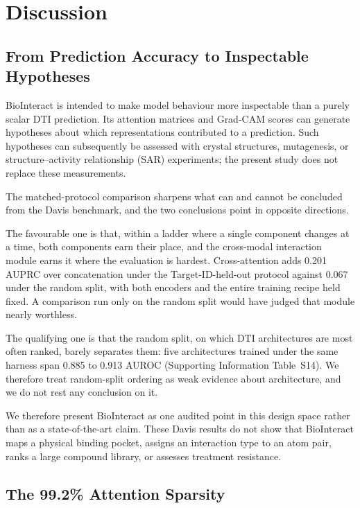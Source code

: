 \documentclass[fleqn,10pt]{wlscirep}
\begin{document}
\section{Discussion}
\label{sec:discussion}

\subsection{From Prediction Accuracy to Inspectable Hypotheses}

BioInteract is intended to make model behaviour more inspectable than a purely
scalar DTI prediction.  Its attention matrices and Grad-CAM scores can generate
hypotheses about which representations contributed to a prediction.  Such
hypotheses can subsequently be assessed with crystal structures, mutagenesis,
or structure--activity relationship (SAR) experiments; the present study does
not replace these measurements.

The matched-protocol comparison sharpens what can and cannot be concluded from
the Davis benchmark, and the two conclusions point in opposite directions.

The favourable one is that, within a ladder where a single component changes at
a time, both components earn their place, and the cross-modal interaction module
earns it where the evaluation is hardest.  Cross-attention adds 0.201 AUPRC over
concatenation under the Target-ID-held-out protocol against 0.067 under the
random split, with both encoders and the entire training recipe held fixed.  A
comparison run only on the random split would have judged that module nearly
worthless.

The qualifying one is that the random split, on which DTI architectures are most
often ranked, barely separates them: five architectures trained under the same
harness span 0.885 to 0.913 AUROC (Supporting Information Table~S14).  We
therefore treat random-split ordering as weak evidence about architecture, and
we do not rest any conclusion on it.

We therefore present BioInteract as one audited point in this design space
rather than as a state-of-the-art claim.  These Davis results
do not show that BioInteract maps a physical binding pocket, assigns an
interaction type to an atom pair, ranks a large compound library, or assesses
treatment resistance.

\subsection{The 99.2\% Attention Sparsity}
\end{document}
